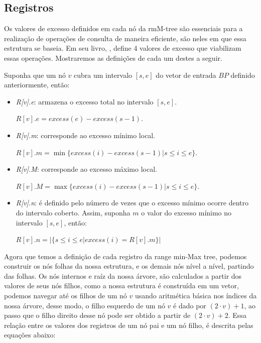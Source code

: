 \subsection{Registros}
Os valores de excesso definidos em cada nó da rmM-tree são essenciais para a realização de operações de consulta de maneira eficiente, são neles em que essa estrutura se baseia.  Em seu livro, \citet{book-compact-data-structures}, define 4 valores de excesso que viabilizam essas operações. Mostraremos as definições de cada um destes a seguir. 

Suponha que um nó $v$ cubra um intervalo $[s,e]$ do vetor de entrada $BP$ definido anteriormente, então:
\begin{itemize}
    \item \textit{R[v].e}: armazena o excesso total no intervalo $[s,e]$.
    
    $R[v].e = excess(e) - excess(s-1)$.
    \item \textit{R[v].m}: corresponde ao excesso mínimo local.
    
    $R[v].m = \min\{excess(i) - excess(s - 1) | s \leq i \leq e\}$.
    \item \textit{R[v].M}: corresponde ao excesso máximo local.
    
    $R[v].M = \max\{excess(i) - excess(s - 1) | s \leq i \leq e\}$.
    
    \item \textit{R[v].n}: é definido pelo número de vezes que o excesso mínimo ocorre dentro do intervalo coberto. Assim, suponha $m$ o valor do excesso mínimo no intervalo $[s,e]$, então:

    $R[v].n = |\{s \leq i \leq e | excess(i) = R[v].m\}|$
\end{itemize}

    Agora que temos a definição de cada registro da range min-Max tree, podemos construir os nós folhas da nossa estrutura, e os demais nós nível a nível, partindo das folhas. Os nós internos e raíz da nossa árvore, são calculados a partir dos valores de seus nós filhos, como a nossa estrutura é construída em um vetor, podemos navegar até os filhos de um nó $v$ usando aritmética básica nos índices da nossa árvore, desse modo, o filho esquerdo de um nó $v$ é dado por $(2 \cdot v)+1$, ao passo que o filho direito desse nó pode ser obtido a partir de $(2 \cdot v) +2$. Essa relação entre os valores dos registros de um nó pai e um nó filho, é descrita pelas equações abaixo:

